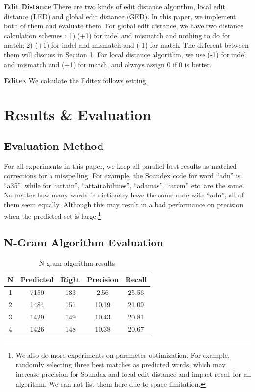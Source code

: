 \documentclass[11pt]{article}
\begin{document}
\noindent\textbf{Edit Distance} There are two kinds of edit distance algorithm, local edit distance (LED) and global edit distance (GED). In this paper,  we implement both of them and evaluate them. For global edit distance, we have two distance calculation schemes : 1) (+1) for indel and mismatch and nothing to do for match; 2) (+1) for indel and mismatch and (-1) for match. The different between them will discuss in Section \ref{lab:res}. For local distance algorithm, we use (-1) for indel and mismatch and (+1) for match, and always assign 0 if 0 is better.

\noindent\textbf{Editex} We calculate the Editex follows  \cite{Zobel1996PhoneticSM} setting.
 
\section{Results \& Evaluation}\label{lab:res}

\subsection{Evaluation Method}

For all experiments in this paper, we keep all parallel best results as matched corrections for a misspelling. For example, the Soundex code for word ``adn'' is ``a35'', while for ``attain'', ``attainabilities'', ``adamas'', ``atom'' etc. are the same. No matter how many words in dictionary have the same code with ``adn'', all of them seem equally. Although this may result in a bad performance on precision when the predicted set is large.\footnote{We also do more experiments on parameter optimization. For example, randomly selecting three best matches as predicted words, which may increase precision for Soundex and local edit distance and impact recall for all algorithm. We can not list them here due to space limitation.}

\subsection{N-Gram Algorithm Evaluation}

\begin{table}
	\centering
	\small
	\begin{tabular}{c|c|c|c|c}
		\hline
		N &Predicted & Right & Precision & Recall \\
		\hline
		1 & 7150 & 183 & 2.56 & 25.56 \\
		\hline
		2 & 1484 & 151 & 10.19 & 21.09  \\
		\hline
		3 & 1429 & 149 & 10.43 & 20.81 \\
		\hline
		4 & 1426 & 148 & 10.38 & 20.67 \\
		\hline
	\end{tabular}
	\caption{N-gram algorithm results}
	\label{tab:ngram}
\end{table}
\end{document}
